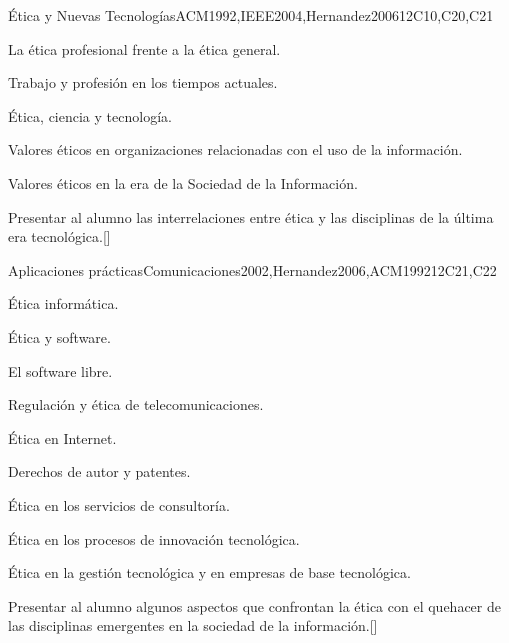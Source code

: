 \begin{syllabus}
\begin{unit}{}{Ética y Nuevas Tecnologías}{ACM1992,IEEE2004,Hernandez2006}{12}{C10,C20,C21}
\begin{topics}
	\item La ética profesional frente a la ética general.
	\item Trabajo y profesión en los tiempos actuales.
	\item Ética, ciencia y tecnología.
	\item Valores éticos en organizaciones relacionadas con el uso de la información.
	\item Valores éticos en la era de la Sociedad de la Información.
\end{topics}
\begin{learningoutcomes}
	\item Presentar al alumno las interrelaciones entre ética y las disciplinas de la última era tecnológica.[\Familiarity]
\end{learningoutcomes}
\end{unit}

\begin{unit}{}{Aplicaciones prácticas}{Comunicaciones2002,Hernandez2006,ACM1992}{12}{C21,C22}
\begin{topics}
    \item Ética informática.
	\begin{subtopics}
	    \item Ética y software.
	    \item El software libre.
	\end{subtopics}
    \item Regulación y ética de telecomunicaciones.
	\begin{subtopics}
	    \item Ética en Internet.
	\end{subtopics}
    \item Derechos de autor y patentes.
    \item Ética en los servicios de consultoría.
    \item Ética en los procesos de innovación tecnológica.
    \item Ética en la gestión tecnológica y en empresas de base tecnológica.
\end{topics}
\begin{learningoutcomes}
	\item Presentar al alumno algunos aspectos que confrontan la ética con el quehacer de las disciplinas emergentes en la sociedad de la información.[\Familiarity]
\end{learningoutcomes}
\end{unit}

\begin{coursebibliography}
\end{coursebibliography}

\end{syllabus}
